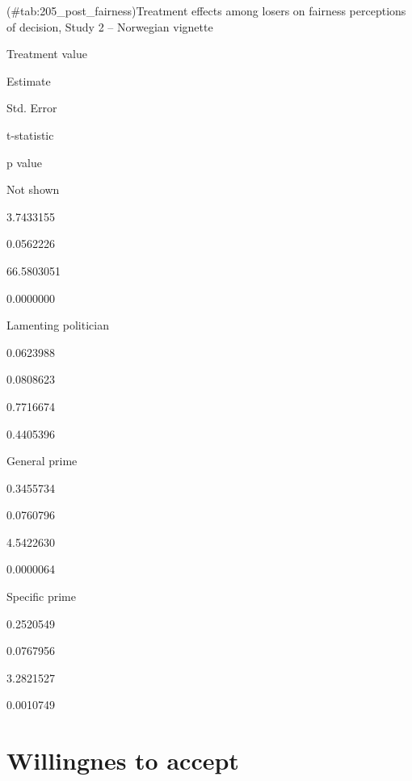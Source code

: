 \documentclass[]{book}
\begin{document}
(\#tab:205\_post\_fairness)Treatment effects among losers on fairness
perceptions of decision, Study 2 -- Norwegian vignette

Treatment value

Estimate

Std. Error

t-statistic

p value

Not shown

3.7433155

0.0562226

66.5803051

0.0000000

Lamenting politician

0.0623988

0.0808623

0.7716674

0.4405396

General prime

0.3455734

0.0760796

4.5422630

0.0000064

Specific prime

0.2520549

0.0767956

3.2821527

0.0010749

\section{Willingnes to accept}\label{willingnes-to-accept-1}
\end{document}
